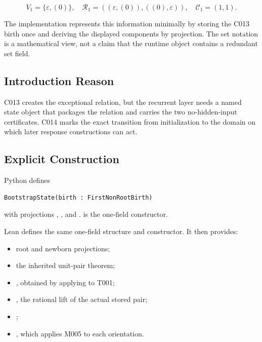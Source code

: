 \[
V_1=\{\varepsilon,(0)\},
\quad
\mathcal R_1=((\varepsilon,(0)),((0),\varepsilon)),
\quad
\mathcal C_1=(1,1).
\]

The implementation represents this information minimally by storing the
C013 birth once and deriving the displayed components by projection. The
set notation is a mathematical view, not a claim that the runtime object
contains a redundant set field.

\subsection{Introduction Reason}\label{introduction-reason-13}

C013 creates the exceptional relation, but the recurrent layer needs a
named state object that packages the relation and carries the two
no-hidden-input certificates. C014 marks the exact transition from
initialization to the domain on which later response constructions can
act.

\subsection{Explicit Construction}\label{explicit-construction-4}

Python defines

\begin{verbatim}
BootstrapState(birth : FirstNonRootBirth)
\end{verbatim}

with projections \texttt{\protect{}}, \texttt{\protect{}},
\texttt{\protect{}} and \texttt{\protect{}}.
\texttt{\protect{}} is the one-field constructor.

Lean defines the same one-field structure and constructor. It then
provides:

\begin{itemize}
\tightlist
\item
  root and newborn projections;
\item
  the inherited unit-pair theorem;
\item
  \texttt{\protect{}}, obtained by applying
  \texttt{\protect{}} to T001;
\item
  \texttt{\protect{}}, the rational lift of the actual
  stored pair;
\item
  \texttt{\protect{}};
\item
  \texttt{\protect{}}, which applies M005 to
  each orientation.
\end{itemize}

